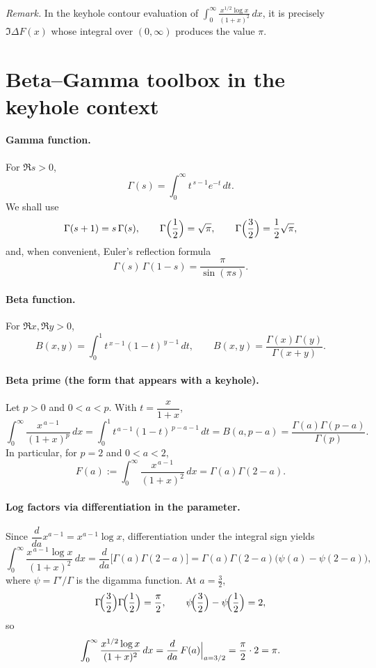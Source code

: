 \documentclass[12pt,a4paper]{article}
\begin{document}
\medskip
\noindent
\emph{Remark.} In the keyhole contour evaluation of
$\displaystyle \int_0^\infty \frac{x^{1/2}\log x}{(1+x)^2}\,dx$,
it is precisely $\Im\Delta F(x)$ whose integral over $(0,\infty)$ produces the value $\pi$.


\section*{Beta--Gamma toolbox in the keyhole context}

\paragraph{Gamma function.}
For $\Re s>0$,
\[
\Gamma(s)=\int_{0}^{\infty} t^{\,s-1} e^{-t}\,dt.
\]
We shall use
\[
\Gamma(s+1)=s\,\Gamma(s),\qquad
\Gamma\Bigl(\frac12\Bigr)=\sqrt{\pi},\qquad
\Gamma\Bigl(\frac32\Bigr)=\frac12\sqrt{\pi},
\]
and, when convenient, Euler’s reflection formula
\[
\Gamma(s)\,\Gamma(1-s)=\frac{\pi}{\sin(\pi s)}.
\]

\bigskip

\paragraph{Beta function.}
For $\Re x,\Re y>0$,
\[
B(x,y)=\int_{0}^{1} t^{\,x-1}(1-t)^{\,y-1}\,dt,
\qquad
B(x,y)=\frac{\Gamma(x)\Gamma(y)}{\Gamma(x+y)}.
\]

\bigskip

\paragraph{Beta prime (the form that appears with a keyhole).}
Let $p>0$ and $0<a<p$. With $t=\dfrac{x}{1+x}$,
\[
\int_{0}^{\infty} \frac{x^{\,a-1}}{(1+x)^{p}}\,dx
=\int_{0}^{1} t^{\,a-1}(1-t)^{\,p-a-1}\,dt
=B(a,p-a)=\frac{\Gamma(a)\Gamma(p-a)}{\Gamma(p)}.
\]
In particular, for $p=2$ and $0<a<2$,
\[
F(a):=\int_{0}^{\infty}\frac{x^{\,a-1}}{(1+x)^2}\,dx
=\Gamma(a)\Gamma(2-a).
\]

\bigskip

\paragraph{Log factors via differentiation in the parameter.}
Since $\dfrac{d}{da}x^{a-1}=x^{a-1}\log x$, differentiation under the integral sign yields
\[
\int_{0}^{\infty}\frac{x^{\,a-1}\log x}{(1+x)^2}\,dx
=\frac{d}{da}\bigl[\Gamma(a)\Gamma(2-a)\bigr]
=\Gamma(a)\Gamma(2-a)\bigl(\psi(a)-\psi(2-a)\bigr),
\]
where $\psi=\Gamma'/\Gamma$ is the digamma function.
At $a=\tfrac32$,
\[
\Gamma\!\Bigl(\frac32\Bigr)\Gamma\!\Bigl(\frac12\Bigr)=\frac{\pi}{2},
\qquad
\psi\!\Bigl(\frac32\Bigr)-\psi\!\Bigl(\frac12\Bigr)=2,
\]
so
\[
\int_{0}^{\infty}\frac{x^{1/2}\log x}{(1+x)^2}\,dx
=\Bigl.\frac{d}{da}\,F(a)\Bigr|_{a=3/2}
=\frac{\pi}{2}\cdot 2
=\pi.
\]
\end{document}
